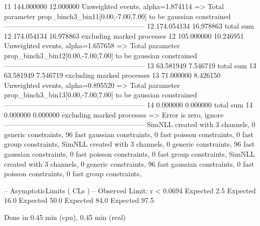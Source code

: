 11         144.000000      12.000000       Unweighted events, alpha=1.874114
  => Total parameter prop_binch3_bin11[0.00,-7.00,7.00] to be gaussian constrained
------------------------------------------------------------
12         174.054134      16.978863       total sum                     
12         174.054134      16.978863       excluding marked processes    
12         105.000000      10.246951       Unweighted events, alpha=1.657658
  => Total parameter prop_binch3_bin12[0.00,-7.00,7.00] to be gaussian constrained
------------------------------------------------------------
13         63.581949       7.546719        total sum                     
13         63.581949       7.546719        excluding marked processes    
13         71.000000       8.426150        Unweighted events, alpha=0.895520
  => Total parameter prop_binch3_bin13[0.00,-7.00,7.00] to be gaussian constrained
------------------------------------------------------------
14         0.000000        0.000000        total sum                     
14         0.000000        0.000000        excluding marked processes    
  => Error is zero, ignore      
------------------------------------------------------------
SimNLL created with 3 channels, 0 generic constraints, 96 fast gaussian constraints, 0 fast poisson constraints, 0 fast group constraints, 
SimNLL created with 3 channels, 0 generic constraints, 96 fast gaussian constraints, 0 fast poisson constraints, 0 fast group constraints, 
SimNLL created with 3 channels, 0 generic constraints, 96 fast gaussian constraints, 0 fast poisson constraints, 0 fast group constraints, 

 -- AsymptoticLimits ( CLs ) --
Observed Limit: r < 0.0694
Expected  2.5%
Expected 16.0%
Expected 50.0%
Expected 84.0%
Expected 97.5%

Done in 0.45 min (cpu), 0.45 min (real)
